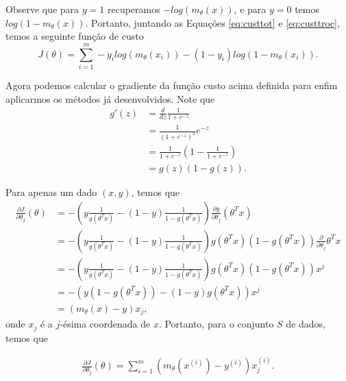 \documentclass[
	12pt,				%
    oneside,			%
	a4paper,			%
	english,			%
	french,				%
	spanish,			%
	brazil,				%
	]{abntex2}
\begin{document}
            Observe que para $y = 1$ recuperamos $-log(m_\theta(x))$, e para $y=0$ temos $log(1-m_\theta(x))$. Portanto, juntando as Equações \eqref{eq:custtot} e \eqref{eq:custtroc}, temos a seguinte função de custo
            \begin{equation*}
                J(\theta) = \sum_{i=1}^{m} -y_ilog(m_\theta(x_i)) - (1-y_i)log(1-m_\theta(x_i)).
            \end{equation*}

            Agora podemos calcular o gradiente da função custo acima definida para enfim aplicarmos os métodos já desenvolvidos. Note que
            \begin{align*}
                g'(z) &= \frac{d}{dz} \frac{1}{1+e^{-z}} \\
                &= \frac{1}{(1+e^{-z})^2} e^{-z} \\
                &=\frac{1}{1+e^{-z}}\left(1-\frac{1}{1+e^{-z}}\right) \\
                &= g(z)(1-g(z)).
            \end{align*}

            Para apenas um dado $(x,y)$, temos que
            \begin{align*}
                \frac{\partial J}{\partial \theta_j}(\theta) &=  -\left(y\frac{1}{g(\theta^Tx)} - (1-y)\frac{1}{1-g(\theta^Tx)}\right)\frac{\partial g}{\partial\theta_j}(\theta^Tx) \\
                &= -\left(y\frac{1}{g(\theta^Tx)} - (1-y)\frac{1}{1-g(\theta^Tx)}\right)g(\theta^Tx)(1-g(\theta^Tx))\frac{\partial}{\partial \theta_j}\theta^Tx \\
                &= -\left(y\frac{1}{g(\theta^Tx)} - (1-y)\frac{1}{1-g(\theta^Tx)}\right)g(\theta^Tx)(1-g(\theta^Tx))x^j \\
                &= -\left(y(1-g(\theta^Tx)) - (1-y)g(\theta^Tx)\right)x^j \\
                &= (m_\theta(x)-y)x_j,
            \end{align*}
            onde $x_j$ é a $j$-ésima coordenada de $x$. Portanto, para o conjunto $S$ de dados, temos que

            \begin{align*}
                \frac{\partial J}{\partial \theta_j}(\theta) = \sum_{i=1}^{m}(m_\theta(x^{(i)})-y^{(i)})x^{(i)}_j.
            \end{align*}
\end{document}
